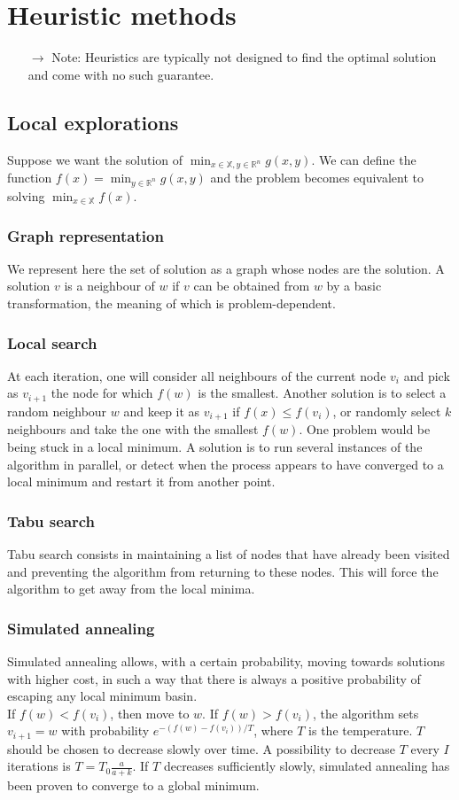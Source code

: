 \documentclass[11pt, openany]{report}
\newcommand{\R}{\mathbb{R}}
\theoremstyle{definition}
\begin{document}
\chapter{Heuristic methods}
\begin{itemize}
    \item [$\rightarrow$] Note: Heuristics are typically not designed to find the optimal solution and come with no such guarantee.
\end{itemize}
\section{Local explorations}
Suppose we want the solution of $\min_{x\in \mathbb{X},y\in \R^n} g(x,y)$. We can define the function $f(x) =\min_{y\in \R^n}g(x,y)$ and the problem becomes equivalent to solving $\min_{x\in \mathbb{X}}f(x)$.\\
\subsection{Graph representation}
We represent here the set of solution as a graph whose nodes are the solution. A solution $v$ is a neighbour of $w$ if $v$ can be obtained from $w$ by a basic transformation, the meaning of which is problem-dependent. 
\subsection{Local search}
At each iteration, one will consider all neighbours of the current node $v_i$ and pick as $v_{i+1}$ the node for which $f(w)$ is the smallest. Another solution is to select a random neighbour $w$ and keep it as $v_{i+1}$ if $f(x)\le f(v_i)$, or randomly select $k$ neighbours and take the one with the smallest $f(w)$. One problem would be being stuck in a local minimum. A solution is to run several instances of the algorithm in parallel, or detect when the process appears to have converged to a local minimum and restart it from another point. 
\subsection{Tabu search}
Tabu search consists in maintaining a list of nodes that have already been visited and preventing the algorithm from returning to these nodes. This will force the algorithm to get away from the local minima. 
\subsection{Simulated annealing}
Simulated annealing allows, with a certain probability, moving towards solutions with higher cost, in such a way that there is always a positive probability of escaping any local minimum basin. \\
If $f(w)<f(v_i)$, then move to $w$. If $f(w)>f(v_i)$, the algorithm sets $v_{i+1}=w$ with probability $e^{-(f(w)-f(v_i))/T}$, where $T$ is the temperature. $T$ should be chosen to decrease slowly over time. A possibility to decrease $T$ every $I$ iterations is $T = T_0 \frac{a}{a+k}$. If $T$ decreases sufficiently slowly, simulated annealing has been proven to converge to a global minimum. \\
\end{document}
